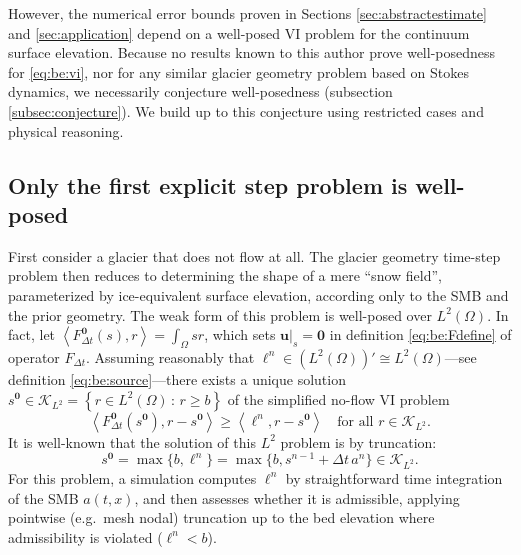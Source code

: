 \documentclass[hidelinks,onefignum,onetabnum,final]{siamart220329}  %
\newcommand{\bu}{\mathbf{u}}
\newcommand{\bzero}{\bm{0}}
\newcommand{\cK}{\mathcal{K}}
\newcommand{\ip}[2]{\left<#1,#2\right>}
\begin{document}
However, the numerical error bounds proven in Sections \ref{sec:abstractestimate} and \ref{sec:application} depend on a well-posed VI problem for the continuum surface elevation.  Because no results known to this author prove well-posedness for \eqref{eq:be:vi}, nor for any similar glacier geometry problem based on Stokes dynamics, we necessarily conjecture well-posedness (subsection \ref{subsec:conjecture}).  We build up to this conjecture using restricted cases and physical reasoning.

\subsection{Only the first explicit step problem is well-posed} \label{subsec:explicit}   First consider a glacier that does not flow at all.  The glacier geometry time-step problem then reduces to determining the shape of a mere ``snow field'', parameterized by ice-equivalent surface elevation, according only to the SMB and the prior geometry.  The weak form of this problem is well-posed over $L^2(\Omega)$.  In fact, let $\ip{F^{\bzero}_{\Delta t}(s)}{r} = \int_\Omega sr$, which sets $\bu|_s=\bzero$ in definition \eqref{eq:be:Fdefine} of operator $F_{\Delta t}$.  Assuming reasonably that $\ell^n \in (L^2(\Omega))' \cong L^2(\Omega)$---see definition \eqref{eq:be:source}---there exists a unique solution $s^{\bzero} \in \cK_{L^2} = \left\{r\in L^2(\Omega)\,:\,r \ge b\right\}$ of the simplified no-flow VI problem
\begin{equation}
\ip{F^{\bzero}_{\Delta t}(s^{\bzero})}{r-s^{\bzero}} \ge \ip{\ell^n}{r-s^{\bzero}} \quad \text{for all } r \in \cK_{L^2}.
\end{equation}
It is well-known \cite[section II.3]{KinderlehrerStampacchia1980} that the solution of this $L^2$ problem is by truncation:
\begin{equation}
s^{\bzero} = \max\{b, \ell^n\} = \max\{b, s^{n-1} + \Delta t\,a^n\} \in \cK_{L^2}.
\end{equation}
For this problem, a simulation computes $\ell^n$ by straightforward time integration of the SMB $a(t,x)$, and then assesses whether it is admissible, applying pointwise (e.g.~mesh nodal) truncation up to the bed elevation where admissibility is violated ($\ell^n < b$).
\end{document}
